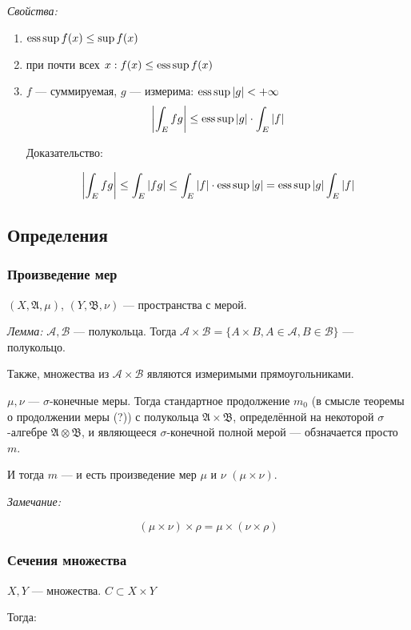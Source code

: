 \documentclass{article}
\begin{document}
\textit{Свойства: }
\begin{enumerate}
    \item $\operatorname*{ess\,sup} f(x) \le \sup f(x)$
    \item при почти всех $x: f(x) \le \operatorname*{ess\,sup} f(x)$
    \item $f$ --- суммируемая, $g$ --- измерима: $\operatorname*{ess\,sup} |g| < + \infty$
    \[\left|\int_{E} fg\right| \le \operatorname*{ess\,sup} |g| \cdot \int_{E} |f|\]

    Доказательство:

    \[\left|\int_{E} fg\right| \le \int_{E} |fg| \le \int_{E} |f| \cdot \operatorname*{ess\,sup} |g| = \operatorname*{ess\,sup} |g| \int_{E} |f|\]
\end{enumerate}

\newpage

\subsection{Определения}
\subsubsection{Произведение мер}
$(X, \mathfrak{A}, \mu)$, $(Y, \mathfrak{B}, \nu)$ --- пространства с мерой.

\textit{Лемма: }
$\mathcal{A}, \mathcal{B}$ --- полукольца. Тогда $\mathcal{A} \times \mathcal{B} = \{A \times B, A \in \mathcal{A}, B \in \mathcal{B}\}$ --- полукольцо.

Также, множества из $\mathcal{A} \times \mathcal{B}$ являются измеримыми прямоугольниками.

$\mu, \nu$ --- $\sigma$-конечные меры. Тогда стандартное продолжение $m_{0}$ (в смысле теоремы о продолжении меры (?)) с полукольца $\mathfrak{A} \times \mathfrak{B}$, определённой на некоторой $\sigma$-алгебре $\mathfrak{A} \otimes \mathfrak{B}$, и являющееся $\sigma$-конечной полной мерой --- обзначается просто $m$.

И тогда $m$ --- и есть произведение мер $\mu$ и $\nu$ $(\mu \times \nu)$.

\textit{Замечание: }

\[(\mu \times \nu) \times \rho = \mu \times (\nu \times \rho)\]

\subsubsection{Сечения множества}

$X, Y$ --- множества. $C \subset X \times Y$

Тогда: 
\end{document}
